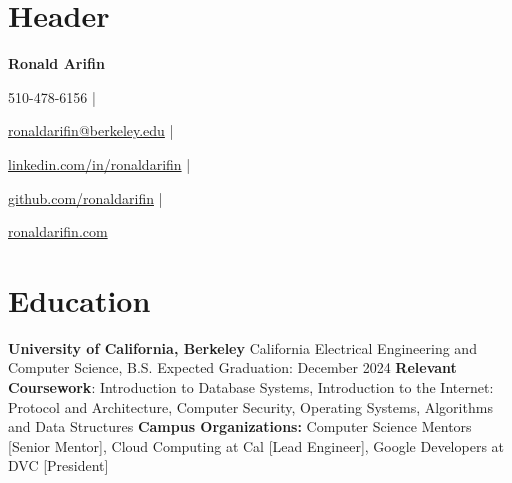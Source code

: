 \documentclass{article}%
\begin{document}
%
\pagestyle{empty}%
\normalsize%
\section*{Header}%
\begin{center}%
\begin{Large}%
\textbf{Ronald Arifin}%
\end{Large}%
\linebreak%
\begin{small}%
510{-}478{-}6156 | %
\end{small}%
\begin{small}%
\href{mailto:ronaldarifin@berkeley.edu}{ronaldarifin@berkeley.edu} | %
\end{small}%
\begin{small}%
\href{https://linkedin.com/in/ronaldarifin}{linkedin.com/in/ronaldarifin} | %
\end{small}%
\begin{small}%
\href{https://github.com/ronaldarifin}{github.com/ronaldarifin} | %
\end{small}%
\begin{small}%
\href{https://www.ronaldarifin.com}{ronaldarifin.com}%
\end{small}%
\end{center}%
\section{Education}%
\label{sec:Education}%
\textbf{University of California, Berkeley}%
\hspace*{1em}%
California%
\newline%
Electrical Engineering and Computer Science, B.S.%
\hspace*{1em}%
Expected Graduation: December 2024%
\newline%
\textbf{Relevant Coursework}: Introduction to Database Systems, Introduction to the Internet: Protocol and Architecture, Computer Security, Operating Systems, Algorithms and Data Structures%
\newline%
\textbf{Campus Organizations:} Computer Science Mentors [Senior Mentor], Cloud Computing at Cal [Lead Engineer], Google Developers at DVC [President]

%
\end{document}
